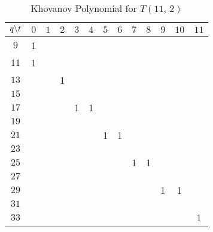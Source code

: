 \documentclass{article}
\theoremstyle{plain}
\begin{document}
        \begin{table}[H]
            \centering
            \begin{tabular}{| c | c | c | c | c | c | c | c | c | c | c | c | c |}
                \hline
                $q\symbol{92}t$&$0$&$1$&$2$&$3$&$4$&$5$&$6$&$7$&$8$&$9$&$10$&$11$\\
                \hline
                $9$&1&&&&&&&&&&&\\
                \hline
                $11$&1&&&&&&&&&&&\\
                \hline
                $13$&&&1&&&&&&&&&\\
                \hline
                $15$&&&&&&&&&&&&\\
                \hline
                $17$&&&&1&1&&&&&&&\\
                \hline
                $19$&&&&&&&&&&&&\\
                \hline
                $21$&&&&&&1&1&&&&&\\
                \hline
                $23$&&&&&&&&&&&&\\
                \hline
                $25$&&&&&&&&1&1&&&\\
                \hline
                $27$&&&&&&&&&&&&\\
                \hline
                $29$&&&&&&&&&&1&1&\\
                \hline
                $31$&&&&&&&&&&&&\\
                \hline
                $33$&&&&&&&&&&&&1\\
                \hline
            \end{tabular}
            \caption{Khovanov Polynomial for $T(11,\,2)$}
            \label{table:t_2_11_kho}
        \end{table}
\end{document}
